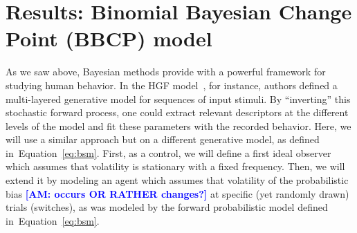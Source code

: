 \documentclass[12pt,english]{article}%
\newcommand{\citep}[1]{\parencite{#1}}
\newcommand{\seeEq}[1]{Equation~\ref{eq:#1}}
\newcommand{\AM}[1]{\textbf{\textcolor{blue}{[AM: #1]}}}
\begin{document}
\section{Results: Binomial Bayesian Change Point (BBCP) model}
\label{sec:bayesian_change_point}
%
%
As we saw above, Bayesian methods provide with
a powerful framework for studying human behavior.
In the HGF model~\citep{Mathys11}, for instance,
authors defined a multi-layered generative model for
sequences of input stimuli.
By ``inverting'' this stochastic forward process,
one could extract relevant descriptors at the different levels of the model
and fit these parameters with the recorded behavior.
Here, we will use a similar approach but on a different generative model,
as defined in~\seeEq{bsm}.
First, as a control, we will define a first ideal observer
which assumes that volatility is stationary with a fixed frequency.
Then, we will extend it by modeling an agent
which assumes that volatility  of the probabilistic bias \AM{occurs OR RATHER changes?}
at specific (yet randomly drawn) trials (switches),
as was modeled by the forward probabilistic model defined in~\seeEq{bsm}.
%
\end{document}
